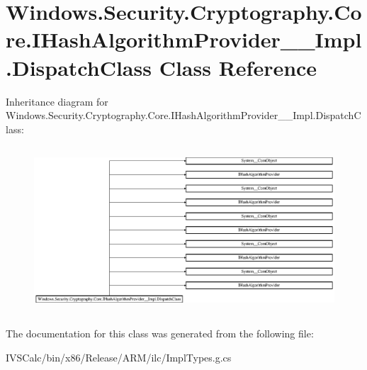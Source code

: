 \hypertarget{class_windows_1_1_security_1_1_cryptography_1_1_core_1_1_i_hash_algorithm_provider_____impl_1_1_dispatch_class}{}\section{Windows.\+Security.\+Cryptography.\+Core.\+I\+Hash\+Algorithm\+Provider\+\_\+\+\_\+\+Impl.\+Dispatch\+Class Class Reference}
\label{class_windows_1_1_security_1_1_cryptography_1_1_core_1_1_i_hash_algorithm_provider_____impl_1_1_dispatch_class}
Inheritance diagram for Windows.\+Security.\+Cryptography.\+Core.\+I\+Hash\+Algorithm\+Provider\+\_\+\+\_\+\+Impl.\+Dispatch\+Class\+:\begin{figure}[H]
\begin{center}
\leavevmode
\includegraphics[height=6.247465cm]{class_windows_1_1_security_1_1_cryptography_1_1_core_1_1_i_hash_algorithm_provider_____impl_1_1_dispatch_class}
\end{center}
\end{figure}


The documentation for this class was generated from the following file\+:\begin{DoxyCompactItemize}
\item 
I\+V\+S\+Calc/bin/x86/\+Release/\+A\+R\+M/ilc/Impl\+Types.\+g.\+cs\end{DoxyCompactItemize}
